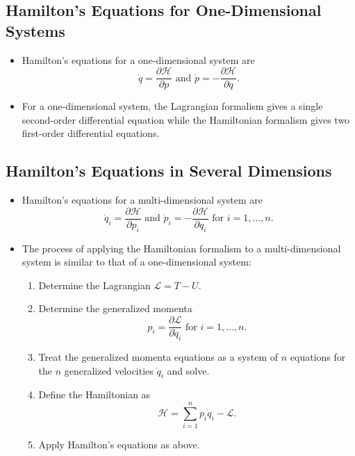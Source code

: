 \documentclass{article}
\begin{document}
\subsection{Hamilton's Equations for One-Dimensional Systems}

\begin{itemize}
  \item Hamilton's equations for a one-dimensional system are \[\dot{q} = \frac{\partial \mathcal{H}}{\partial p} \text{ and } \dot{p} = -\frac{\partial \mathcal{H}}{\partial q}.\]

  \item For a one-dimensional system, the Lagrangian formalism gives a single second-order differential equation while the Hamiltonian formalism gives two first-order differential equations.
\end{itemize}

\subsection{Hamilton's Equations in Several Dimensions}

\begin{itemize}
  \item Hamilton's equations for a multi-dimensional system are \[\dot{q}_i = \frac{\partial \mathcal{H}}{\partial p_i} \text{ and } \dot{p}_i = -\frac{\partial \mathcal{H}}{\partial q_i} \text{ for } i = 1, \ldots, n.\]

  \item The process of applying the Hamiltonian formalism to a multi-dimensional system is similar to that of a one-dimensional system:

        \begin{enumerate}
          \item Determine the Lagrangian $\mathcal{L} = T - U$.

          \item Determine the generalized momenta \[p_i = \frac{\partial \mathcal{L}}{\partial \dot{q}_i} \text{ for } i = 1, \ldots, n.\]

          \item Treat the generalized momenta equations as a system of $n$ equations for the $n$ generalized velocities $\dot{q}_i$ and solve.

          \item Define the Hamiltonian as \[\mathcal{H} = \sum_{i = 1}^n p_i \dot{q}_i - \mathcal{L}.\]

          \item Apply Hamilton's equations as above.
        \end{enumerate}
\end{itemize}
\end{document}
